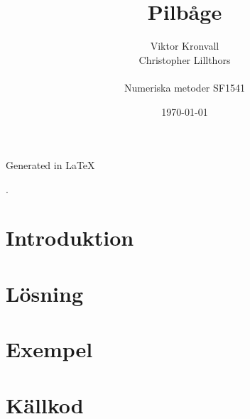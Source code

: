 \documentclass[a4paper,11pt,twoside]{article}
\title{Pilbåge}
\author{
  Viktor Kronvall \\
  Christopher Lillthors \\
  \\
  Numeriska metoder SF1541
}
\date{\today}
\begin{document}
\maketitle
\tableofcontents
\begin{frame}
\null
\vfill
Generated in \LaTeX
\end{frame}
\thispagestyle{empty}.
\newpage
\clearpage
\setcounter{page}{1}

\section{Introduktion}

\section{Lösning}

\section{Exempel}

\section{Källkod}
\end{document}
